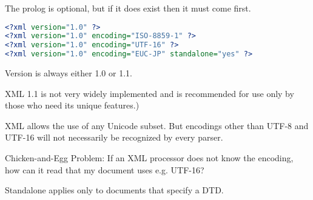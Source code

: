 The prolog is optional, but if it does exist then it must come first.
\begin{lstlisting}[language=XML]
<?xml version="1.0" ?>
<?xml version="1.0" encoding="ISO-8859-1" ?>
<?xml version="1.0" encoding="UTF-16" ?>
<?xml version="1.0" encoding="EUC-JP" standalone="yes" ?>
\end{lstlisting}

Version is always either 1.0 or 1.1.

XML 1.1 is not very widely implemented and is recommended for use only by those who need its unique features.)

XML allows the use of any Unicode subset. But encodings other than UTF-8 and UTF-16 will not necessarily be recognized by every parser. 

Chicken-and-Egg Problem: If an XML processor does not know the encoding, how can it read that my document uses e.g. UTF-16?

Standalone applies only to documents that specify a DTD.